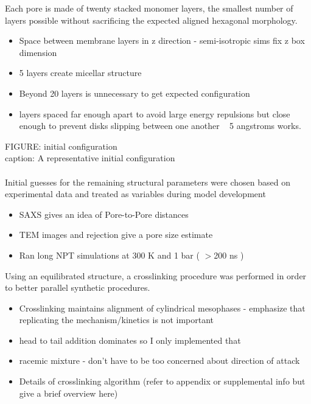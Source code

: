 \documentclass{article}
\begin{document}
	Each pore is made of twenty stacked monomer layers, the smallest number of layers possible without sacrificing the expected aligned hexagonal morphology.
	\begin{itemize}
		\item Space between membrane layers in z direction - semi-isotropic sims fix z box dimension
		\item 5 layers create micellar structure %
		\item Beyond 20 layers is unnecessary to get expected configuration
		\item layers spaced far enough apart to avoid large energy repulsions but close enough to prevent disks slipping between one another ~ 5 angstroms works.
	\end{itemize}
	FIGURE: initial configuration \\
	caption: A representative initial configuration \\
	\\
	\noindent Initial guesses for the remaining structural parameters were chosen based on experimental data and treated as variables during model development 
	\begin{itemize}
		\item SAXS gives an idea of Pore-to-Pore distances
		\item TEM images and rejection give a pore size estimate
		\item Ran long NPT simulations at 300 K and 1 bar ( $>$200 ns )
	\end{itemize}
	
	Using an equilibrated structure, a crosslinking procedure was performed in order to better parallel synthetic procedures. 
	\begin{itemize}
		\item Crosslinking maintains alignment of cylindrical mesophases - emphasize that replicating the mechanism/kinetics is not important 
		\item head to tail addition dominates so I only implemented that
		\item racemic mixture - don't have to be too concerned about direction of attack 
		\item Details of crosslinking algorithm (refer to appendix or supplemental info but give a brief overview here)
	\end{itemize}  
	
\end{document}
